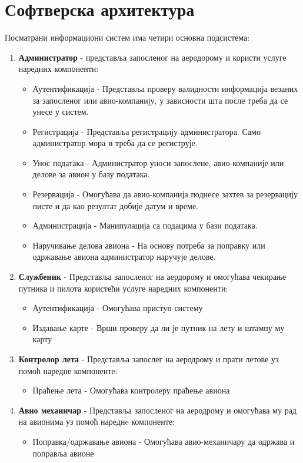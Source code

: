 \documentclass{article}
\begin{document}
\section{Софтверска архитектура}
Посматрани информациони систем има четири основна подсистема:
\begin{enumerate}
    \item \textbf{Администратор} - представља запосленог на аеродорому и користи услуге наредних компоненти:
        \begin{itemize}
            \item Аутентификација - Представља проверу валидности информација везаних за запосленог или авио-компанију, у зависности шта после треба да се унесе у систем.
            \item Регистрација - Представља регистрацију администратора. Само администратор мора и треба да се региструје.
            \item Унос података - Администратор уноси запослене, авио-компаније или делове за авион у базу података.
            \item Резервација - Омогућава да авио-компанија поднесе захтев за резервацију писте и да као резултат добије датум и време.
            \item Администрација - Манипулација са подацима у бази података.
            \item Наручивање делова авиона - На основу потреба за поправку или одржавање авиона администратор наручује делове.
        \end{itemize}
    \item \textbf{Службеник} - Представља запосленог на аердорому и омогућава чекирање путника и пилота користећи услуге наредних компоненти:
        \begin{itemize}
            \item Аутентификација - Омогућава приступ систему
            \item Издавање карте - Врши проверу да ли је путник на лету и штампу му карту
        \end{itemize} 
    \item \textbf{Контролор лета} - Представља запослег на аеродрому и прати летове уз помоћ наредне компоненте:
        \begin{itemize}
            \item Праћење лета - Омогућава контролеру праћење авиона
        \end{itemize}
    \item \textbf{Авио механичар} - Представља запосленог на аеродрому и омогућава му рад на авионима уз помоћ нареднe компоненте:
        \begin{itemize}
            \item Поправка/одржавање авиона - Омогућава авио-механичару да одржава и поправља авионе
        \end{itemize}
\end{enumerate}
\end{document}
